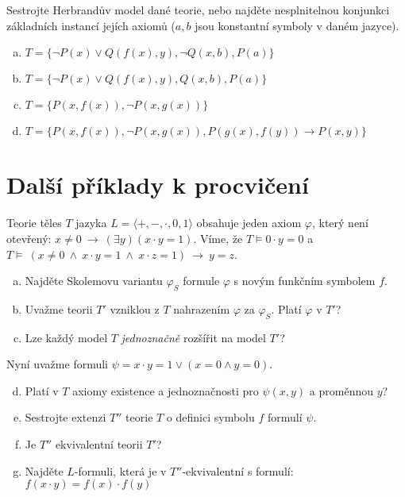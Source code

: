 \begin{problem} 
    
    Sestrojte Herbrandův model dané teorie, nebo najděte nesplnitelnou konjunkci základních instancí jejích axiomů ($a,b$ jsou konstantní symboly v daném jazyce).    
    \begin{enumerate}[(a)]
        \item $T=\{\neg P(x)\vee Q(f(x),y), \neg Q(x,b), P(a)\}$
        \item $T=\{\neg P(x)\vee Q(f(x),y), Q(x,b), P(a)\}$
        \item $T=\{P(x,f(x)),\neg P(x,g(x))\}$
        \item $T=\{P(x,f(x)),\neg P(x,g(x)), P(g(x),f(y)) \to P(x,y)\}$
    \end{enumerate}

    \begin{solution}
                    
    \end{solution}

\end{problem}

        
\section*{Další příklady k procvičení}


\begin{problem}

    Teorie těles $T$ jazyka $L=\langle +,-,\cdot,0,1\rangle$ obsahuje jeden axiom $\varphi$, který není otevřený: $x\neq 0\ \to\ (\exists y)(x\cdot y=1)$. Víme, že $T\models 0\cdot y=0$ a $T\models\ (x\ne 0\ \wedge\ x\cdot y=1\ \wedge\ x\cdot z=1)\ \to\ y=z$.
    \begin{enumerate}[(a)]
        \item Najděte Skolemovu variantu $\varphi_S$ formule $\varphi$ s novým funkčním symbolem $f$.
        \item Uvažme teorii $T'$ vzniklou z $T$ nahrazením $\varphi$ za $\varphi_S$. Platí $\varphi$ v $T'$?
        \item Lze každý model $T$ \emph{jednoznačně} rozšířit na model $T'$?
    \end{enumerate}
    Nyní uvažme formuli $\psi=x\cdot y=1\vee  (x=0 \wedge y=0)$.
    \begin{enumerate}[(a)]
        \setcounter{enumi}{3}
        \item Platí v $T$ axiomy existence a jednoznačnosti pro $\psi(x,y)$ a proměnnou $y$?
        \item Sestrojte extenzi $T''$ teorie $T$ o definici symbolu $f$ formulí $\psi$.
        \item Je $T''$ ekvivalentní teorii $T'$?
        \item Najděte $L$-formuli, která je v $T''$-ekvivalentní s formulí:
        $f(x\cdot y)=f(x)\cdot f(y)$
    \end{enumerate}

\end{problem}


